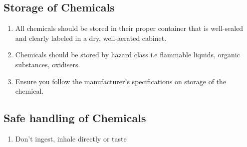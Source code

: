 \documentclass[12pt,letterpaper]{article}
\begin{document}
        \subsection{Storage of Chemicals}
            \begin{enumerate}
                \begin{enumerate}
                    \item All chemicals should be stored in their proper
                    container that is well-sealed and clearly labeled in a
                    dry, well-aerated cabinet.
                    \item Chemicals should be stored by hazard class i.e
                    flammable liquids, organic substances, oxidisers.\footnotemark[1]\footnotemark[2]
                    \item Ensure you follow the manufacturer's specifications
                    on storage of the chemical.\footnotemark[3]
                \end{enumerate}
            \end{enumerate}
        \subsection{Safe handling of Chemicals}
            \begin{enumerate}
                \begin{enumerate}
                     \item Don't ingest, inhale directly or taste
                \end{enumerate}
            \end{enumerate} 

    \printbibliography
\end{document}
